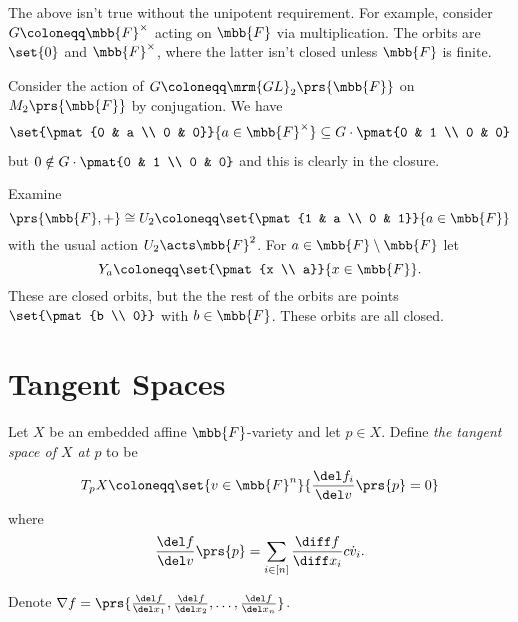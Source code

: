 \documentclass[10pt,a4paper,twoside,openany,hidelinks]{book}
\begin{document}
\begin{remark}
The above isn't true without the unipotent requirement.
For example, consider $G \coloneqq \mbb{F}^\times$ acting on $\mbb{F}$ via multiplication.
The orbits are $\set{0}$ and $\mbb{F}^\times$, where the latter isn't closed unless $\mbb{F}$ is finite.
\end{remark}

\begin{example}
Consider the action of $G \coloneqq \mrm{GL}_2\prs{\mbb{F}}$ on $M_2\prs{\mbb{F}}$ by conjugation. We have
\begin{align*}
\set{\pmat{0 & a \\ 0 & 0}}{a \in \mbb{F}^{\times}} \subseteq G \cdot \pmat{0 & 1 \\ 0 & 0}
\end{align*}
but $0 \notin G \cdot \pmat{0 & 1 \\ 0 & 0}$ and this is clearly in the closure.
\end{example}

\begin{example}
Examine
\[\prs{\mbb{F}, +} \cong U_2 \coloneqq \set{\pmat{1 & a \\ 0 & 1}}{a \in \mbb{F}}\]
with the usual action $U_2 \acts \mbb{F}^2$.
For $a \in \mbb{F} \setminus \mbb{F}$ let
\[Y_a \coloneqq \set{\pmat{x \\ a}}{x \in \mbb{F}} \text{.}\]
These are closed orbits, but the the rest of the orbits are points $\set{\pmat{b \\ 0}}$ with $b \in \mbb{F}$. These orbits are all closed.
\end{example}

\section{Tangent Spaces}

\begin{definition}
Let $X$ be an embedded affine $\mbb{F}$-variety and let $p \in X$.
Define \emph{the tangent space of $X$ at $p$} to be
\begin{align*}
T_p X \coloneqq \set{v \in \mbb{F}^n}{\frac{\del f_i}{\del v} \prs{p} = 0}
\end{align*}
where
\[\frac{\del f}{\del v}\prs{p} = \sum_{i \in [n]} \frac{\diff f}{\diff x_i} c\dot v_i \text{.}\]
\end{definition}

\begin{notation}
Denote $\nabla f = \prs{\frac{\del f}{\del x_1}, \frac{\del f}{\del x_2}, \ldots, \frac{\del f}{\del x_n}}$.
\end{notation}
\end{document}
